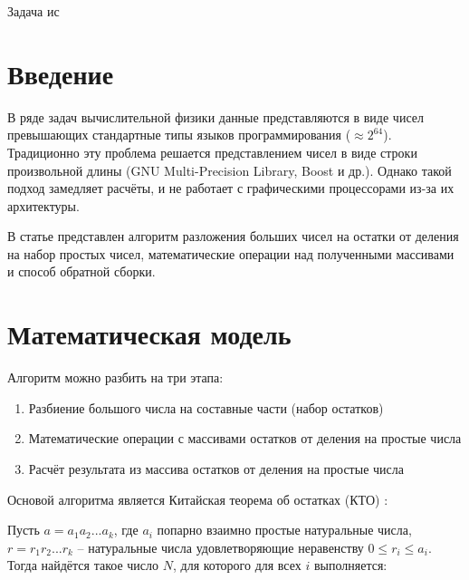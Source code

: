 \documentclass[10pt]{article}
\begin{document}
\makeface



\abstract Задача ис 



\section*{Введение}

В ряде задач вычислительной физики данные представляются в виде чисел превышающих стандартные типы языков программирования ($\approx 2^{64}$). Традиционно эту проблема решается представлением чисел в виде строки произвольной длины (GNU Multi-Precision Library, Boost и др.). Однако такой подход замедляет расчёты, и не работает с графическими процессорами из-за их архитектуры.

В статье представлен алгоритм разложения больших чисел на остатки от деления на набор простых чисел, математические операции над полученными массивами и способ обратной сборки.

\section{Математическая модель} 

Алгоритм можно разбить на три этапа: 

\begin{enumerate}
	\item Разбиение большого числа на составные части (набор остатков)
	\item Математические операции с массивами остатков от деления на простые числа
	\item Расчёт результата из массива остатков от деления на простые числа
\end{enumerate}

Основой алгоритма является Китайская теорема об остатках (КТО) \cite{Cormen2001}:

Пусть $a = a_1 a_2 ... a_k$, где $a_i$ попарно взаимно простые натуральные числа, $r = r_1 r_2 ... r_k$ -- натуральные числа удовлетворяющие неравенству $0 \leq r_i \le a_i$. Тогда найдётся такое число
$N$, для которого для всех $i$ выполняется:
\end{document}
